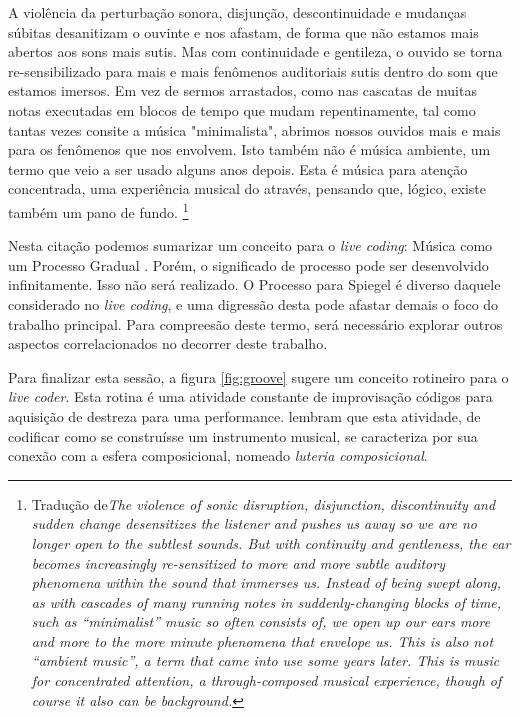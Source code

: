\begin{citacao}
 A violência da perturbação sonora, disjunção, descontinuidade e mudanças súbitas desanitizam o ouvinte e nos afastam, de forma que não estamos mais abertos aos sons mais sutis. Mas com continuidade e gentileza, o ouvido se torna re-sensibilizado para mais e mais fenômenos auditoriais sutis dentro do som que estamos imersos. Em vez de sermos arrastados, como nas cascatas de muitas notas executadas em blocos de tempo que mudam repentinamente, tal como tantas vezes consite a música "minimalista", abrimos nossos ouvidos mais e mais para os fenômenos que nos envolvem. Isto também não é música ambiente, um termo que veio a ser usado alguns anos depois. Esta é música para atenção concentrada, uma experiência musical do através, pensando que, lógico, existe também um pano de fundo. \footnote{Tradução de\emph{The violence of sonic disruption, disjunction, discontinuity and sudden change desensitizes the listener and pushes us away so we are no longer open to the subtlest sounds. But with continuity and gentleness, the ear becomes increasingly re-sensitized to more and more subtle auditory phenomena within the sound that immerses us. Instead of being swept along, as with cascades of many running notes in suddenly-changing blocks of time, such as “minimalist” music so often consists of, we open up our ears more and more to the more minute phenomena that envelope us. This is also not “ambient music”, a term that came into use some years later. This is music for concentrated attention, a through-composed musical experience, though of course it also can be background.}}
\end{citacao}

Nesta citação podemos sumarizar um conceito para o \emph{live coding}: Música como um Processo Gradual . Porém, o significado de processo pode ser desenvolvido infinitamente. Isso não será realizado. O Processo para Spiegel é diverso daquele considerado no \emph{live coding}, e uma digressão desta pode afastar demais o foco do trabalho principal. Para compreesão deste termo, será necessário explorar outros aspectos correlacionados no decorrer deste trabalho.

Para finalizar esta sessão, a figura \autoref{fig:groove} sugere um conceito rotineiro para o \emph{live coder}. Esta rotina é uma atividade constante de improvisação códigos para aquisição de destreza para uma performance.  lembram que esta atividade, de codificar como se construísse um instrumento musical, se caracteriza por sua conexão com a esfera composicional, nomeado \emph{luteria composicional}.